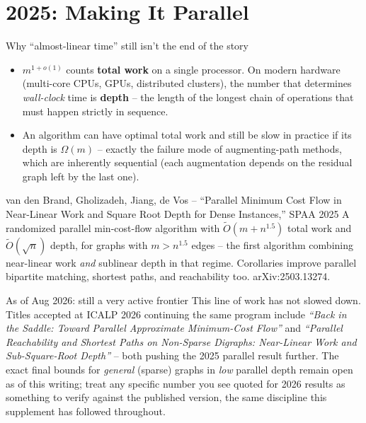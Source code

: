 \documentclass[11pt,aspectratio=169]{beamer}
\begin{document}
\section{2025: Making It Parallel}

\begin{frame}{Why ``almost-linear time'' still isn't the end of the story}
  \begin{itemize}
    \item $m^{1+o(1)}$ counts \textbf{total work} on a single processor. On modern
    hardware (multi-core CPUs, GPUs, distributed clusters), the number that determines
    \emph{wall-clock} time is \textbf{depth} -- the length of the longest chain of
    operations that must happen strictly in sequence.
    \item An algorithm can have optimal total work and still be slow in practice if its
    depth is $\Omega(m)$ -- exactly the failure mode of augmenting-path methods, which
    are inherently sequential (each augmentation depends on the residual graph left by
    the last one).
  \end{itemize}
  \begin{block}{van den Brand, Gholizadeh, Jiang, de Vos -- ``Parallel Minimum Cost Flow
  in Near-Linear Work and Square Root Depth for Dense Instances,'' SPAA 2025}
    A randomized parallel min-cost-flow algorithm with $\tilde O(m+n^{1.5})$ total work
    and $\tilde O(\sqrt{n})$ depth, for graphs with $m > n^{1.5}$ edges -- the first
    algorithm combining near-linear work \emph{and} sublinear depth in that regime.
    Corollaries improve parallel bipartite matching, shortest paths, and reachability
    too. arXiv:2503.13274.
  \end{block}
\end{frame}

\begin{frame}{As of Aug 2026: still a very active frontier}
  \small
  This line of work has not slowed down. Titles accepted at ICALP 2026 continuing the
  same program include \emph{``Back in the Saddle: Toward Parallel Approximate
  Minimum-Cost Flow''} and \emph{``Parallel Reachability and Shortest Paths on
  Non-Sparse Digraphs: Near-Linear Work and Sub-Square-Root Depth''} -- both pushing
  the 2025 parallel result further. The exact final bounds for \emph{general} (sparse)
  graphs in \emph{low} parallel depth remain open as of this writing; treat any specific
  number you see quoted for 2026 results as something to verify against the published
  version, the same discipline this supplement has followed throughout.
\end{frame}
\end{document}

